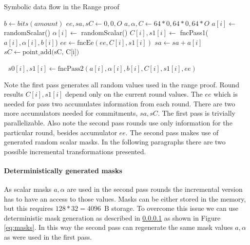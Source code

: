 \documentclass[]{article}
\begin{document}
\begin{algorithm}[]
	\caption{Symbolic data flow in the Range proof} \label{alg:rangeproof}
	\begin{algorithmic}[1]
		\State $b \gets bits(amount)$
		\State $ee, sa, sC \gets 0, 0, O$
		\State $a, \alpha, C \gets 64 * 0, 64 * 0, 64 * O$
		  
			\State $a[i] \gets$ randomScalar()
			\State $\alpha[i] \gets$ randomScalar()
			\State $C[i], s1[i] \gets $ fncPass1($a[i], \alpha[i], b[i]$) 
			\State $ee \gets \text{fncEe}(ee, C[i], s1[i])$ 
			\State $sa \gets sa + a[i]$ 
			\State $sC \gets \text{point\_add(sC, C[i])}$
		\EndFor
		
		\State $\;$
		  
			\State $s0[i], s1[i] \gets \text{fncPass2}(a[i], \alpha[i], b[i], C[i], s1[i], ee)$ 
		\EndFor \\
		
		\EndFunction	
	\end{algorithmic}
\end{algorithm}

Note the first pass generates all random values used in the range proof. Round results $C[i], s1[i]$ depend only on the current round values. The $ee$ which is needed for pass two accumulates information from each round. There are two more accumulators needed for commitments, $sa, sC$.
The first pass is trivially parallelizable.
Also note the second pass rounds use only information for the particular round, besides accumulator $ee$.
The second pass makes use of generated random scalar masks. In the following paragraphs there are two possible incremental transformations presented.

\paragraph{Deterministically generated masks} \label{par:det_masks}
As scalar masks $a, \alpha$ are used in the second pass rounds the incremental version has to have an access to those values. Masks can be either stored in the memory, but this requires $128*32 = 4096$~B storage.
To overcome this issue we can use deterministic mask generation as described in \ref{par:det_masks} as shown in Figure \ref{eq:masks}. In this way the second pass can regenerate the same mask values $a, \alpha$ as were used in the first pass.
\end{document}
